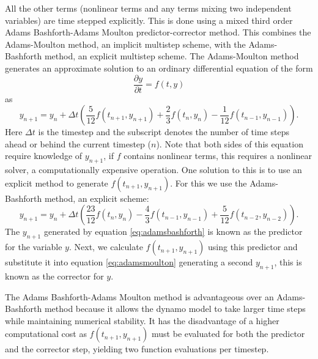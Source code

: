 All the other terms (nonlinear terms and any terms mixing two independent variables) are time stepped explicitly. This is done using a mixed third order Adams Bashforth-Adams Moulton predictor-corrector method. This combines the Adams-Moulton method, an implicit multistep scheme, with the Adams-Bashforth method, an explicit multistep scheme. The Adams-Moulton method generates an approximate solution to an ordinary differential equation of the form
\begin{equation}
\frac{\partial y}{\partial t}=f\left(t, y\right)
\end{equation}
as 
\begin{equation}
\label{eq:adamsmoulton}
y_{n+1} = y_{n} + \Delta t \left( \frac{5}{12} f(t_{n+1},y_{n+1}) + \frac{2}{3} f(t_{n},y_{n}) - \frac{1}{12} f(t_{n-1},y_{n-1}) \right).
\end{equation}
Here $\Delta t$ is the timestep and the subscript denotes the number of time steps ahead or behind the current timestep ($n$). Note that both sides of this equation require knowledge of $y_{n+1}$, if $f$ contains nonlinear terms, this requires a nonlinear solver, a computationally expensive operation.  One solution to this is to use an explicit method to generate $f\left(t_{n+1}, y_{n+1}\right)$. For this we use the Adams-Bashforth method, an explicit scheme:
\begin{equation}
\label{eq:adamsbashforth}
y_{n+1}  = y_{n} + \Delta t\left( \frac{23}{12} f(t_{n}, y_{n}) - \frac43 f(t_{n-1}, y_{n-1}) + \frac{5}{12}f(t_{n-2}, y_{n-2})\right).
\end{equation}
The $y_{n+1}$ generated by equation \ref{eq:adamsbashforth} is known as the predictor for the variable $y$. Next, we calculate $f(t_{n+1},y_{n+1})$ using this predictor and substitute it into equation \ref{eq:adamsmoulton} generating a second $y_{n+1}$, this is known as the corrector for $y$.

The Adams Bashforth-Adams Moulton method is advantageous over an Adams-Bashforth method because it allows the dynamo model to take larger time steps while maintaining numerical stability. It has the disadvantage of a higher computational cost as $f(t_{n+1},y_{n+1})$ must be evaluated for both the predictor and the corrector step, yielding two function evaluations per timestep. 

